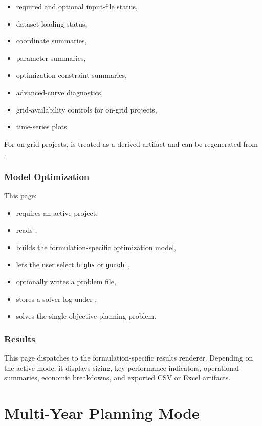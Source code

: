 \documentclass[11pt,a4paper]{report}
\newcommand{\code}[1]{\texttt{#1}}
\begin{document}
\begin{itemize}[leftmargin=1.5em]
  \item required and optional input-file status,
  \item dataset-loading status,
  \item coordinate summaries,
  \item parameter summaries,
  \item optimization-constraint summaries,
  \item advanced-curve diagnostics,
  \item grid-availability controls for on-grid projects,
  \item time-series plots.
\end{itemize}

For on-grid projects,  is treated as a derived artifact and can be regenerated from .

\section{Model Optimization}

This page:

\begin{itemize}[leftmargin=1.5em]
  \item requires an active project,
  \item reads ,
  \item builds the formulation-specific optimization model,
  \item lets the user select \code{highs} or \code{gurobi},
  \item optionally writes a problem file,
  \item stores a solver log under ,
  \item solves the single-objective planning problem.
\end{itemize}

\section{Results}

This page dispatches to the formulation-specific results renderer. Depending on the active mode, it displays sizing, key performance indicators, operational summaries, economic breakdowns, and exported CSV or Excel artifacts.

\part{Multi-Year Planning Mode}
\end{document}
